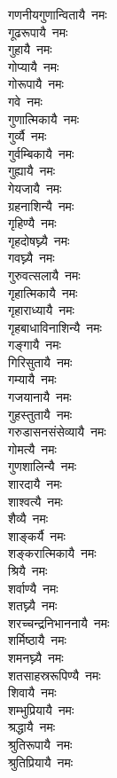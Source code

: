 \begin{flushleft}
\begin{multicols}{2}
गणनीयगुणान्वितायै~नमः\\
गूढरूपायै~नमः\\
गुहायै~नमः\\
गोप्यायै~नमः\\
गोरूपायै~नमः\hfill{}\\
गवे~नमः\\
गुणात्मिकायै~नमः\\
गुर्व्यै~नमः\\
गुर्वम्बिकायै~नमः\\
गुह्यायै~नमः\\
गेयजायै~नमः\\
ग्रहनाशिन्यै~नमः\\
गृहिण्यै~नमः\\
गृहदोषघ्न्यै~नमः\\
गवघ्न्यै~नमः\hfill{}\\
गुरुवत्सलायै~नमः\\
गृहात्मिकायै~नमः\\
गृहाराध्यायै~नमः\\
गृहबाधाविनाशिन्यै~नमः\\
गङ्गायै~नमः\\
गिरिसुतायै~नमः\\
गम्यायै~नमः\\
गजयानायै~नमः\\
गुहस्तुतायै~नमः\\
गरुडासनसंसेव्यायै~नमः\hfill{}\\
गोमत्यै~नमः\\
गुणशालिन्यै~नमः\\
शारदायै~नमः\\
शाश्वत्यै~नमः\\
शैव्यै~नमः\\
शाङ्कर्यै~नमः\\
शङ्करात्मिकायै~नमः\\
श्रियै~नमः\\
शर्वाण्यै~नमः\\
शतघ्न्यै~नमः\hfill{}\\
शरच्चन्द्रनिभाननायै~नमः\\
शर्मिष्ठायै~नमः\\
शमनघ्न्यै~नमः\\
शतसाहस्ररूपिण्यै~नमः\\
शिवायै~नमः\\
शम्भुप्रियायै~नमः\\
श्रद्धायै~नमः\\
श्रुतिरूपायै~नमः\\
श्रुतिप्रियायै~नमः\\

\end{multicols}
\end{flushleft}
